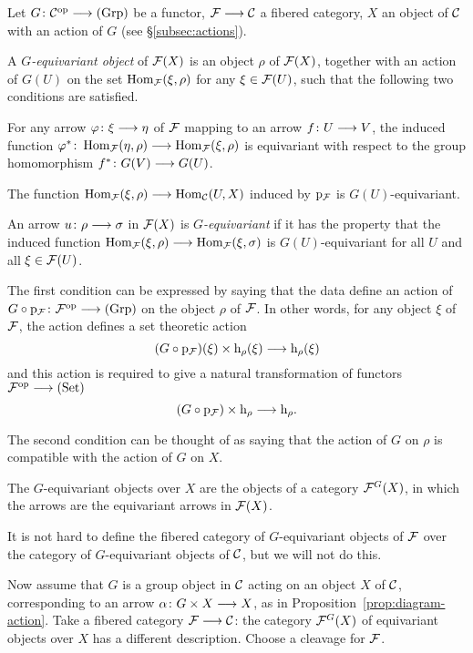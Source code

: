 \begin{3   FIBERED CATEGORIES}
\begin{3.8 Equivariant objects in fibcats}
Let $G \colon \cC\op \arr \catgrp$ be a functor, $\cF \arr \cC$ a fibered category, $X$ an object of $\mathcal{C}$ with an action of $G$ (see \S\ref{subsec:actions}).

\begin{definition}
A \emph{$G$-equivariant object} of $\mathcal{F}(X)$ is an object $\rho$ of $\mathcal{F}(X)$, together with an action of $G(U)$ on the set $\operatorname{Hom}_{\mathcal{F}}(\xi, \rho)$ for any $\xi \in \mathcal{F}(U)$, such that the following two conditions are satisfied.
\begin{enumeratei}

 For any arrow  $\phi \colon \xi \arr \eta$ of $\mathcal{F}$ mapping to an arrow $f \colon U \arr V$, the induced function $\phi^* \colon \hom_{\cF}(\eta, \rho) \arr \hom_{\cF}(\xi, \rho)$ is equivariant with respect to the group homomorphism $f^* \colon G(V) \arr G(U)$.

 The function $ \hom_{\cF}(\xi, \rho) \arr  \hom_{\cC}(U, X)$ induced by $\mathrm{p}_{\mathcal{F}}$ is $G(U)$-equivariant.

\end{enumeratei}
An arrow $u \colon \rho \arr \sigma$ in $\mathcal{F}(X)$ is \emph{$G$-equivariant} if it has the property that the induced function $\hom_{\cF}(\xi, \rho) \arr \hom_{\cF}(\xi, \sigma)$ is $G(U)$-equivariant for all $U$  and all $\xi\in \mathcal{F}(U)$.
\end{definition}

The first condition can be expressed by saying that the data define an action of $G \circ \p_{\cF} \colon \cF\op \arr \catgrp$ on the object $\rho$ of $\mathcal{F}$. In other words, for any object $\xi$ of $\mathcal{F}$, the action defines a set theoretic action
   \[
   (G \circ \p_{\cF})(\xi) \times \h_{\rho}(\xi)
   \arr \h_{\rho}(\xi)
   \]
and this action is required to give a natural transformation of functors $\cF\op \arr \catset$
   \[
   (G \circ \p_{\cF})\times \h_{\rho}
   \arr \h_{\rho}.
   \]

The second condition can be thought of as saying that the action of $G$ on $\rho$ is compatible with the action of $G$ on $X$.

The $G$-equivariant objects over $X$ are the objects of a category $\mathcal{F}^G(X)$, in which the arrows are the equivariant arrows in $\mathcal{F}(X)$. 

It is not hard to define the fibered category of $G$-equivariant objects of $\mathcal{F}$ over the category of $G$-equivariant objects of $\mathcal{C}$, but we will not do this.

Now assume that $G$ is a group object in $\mathcal{C}$ acting on an object $X$ of $\mathcal{C}$, corresponding to  an arrow $\alpha \colon G \times X \arr X$, as in Proposition~\ref{prop:diagram-action}. Take a fibered category $\cF \arr \cC$: the category $\mathcal{F}^{G}(X)$ of equivariant objects over $X$ has a different description. Choose a cleavage for $\mathcal{F}$.


\end{3.8 Equivariant objects in fibcats}
\end{3   FIBERED CATEGORIES}
